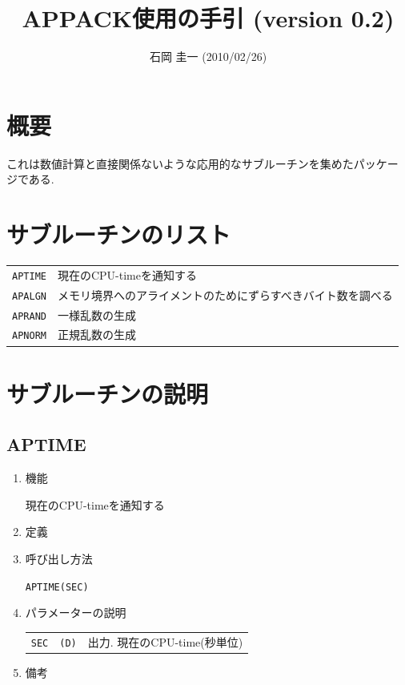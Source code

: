 \documentclass[a4j]{jarticle}
\title{APPACK使用の手引 (version 0.2)}
\author{石岡 圭一  (2010/02/26)}
\date{}
\begin{document}
\maketitle

\section{概要}

これは数値計算と直接関係ないような応用的なサブルーチンを集めたパッケー
ジである.


\section{サブルーチンのリスト}

\vspace{1em}
\begin{tabular}{ll}
{\tt APTIME} & 現在のCPU-timeを通知する\\
{\tt APALGN} & メモリ境界へのアライメントのためにずらすべきバイト数を調べる\\
{\tt APRAND} & 一様乱数の生成\\
{\tt APNORM} & 正規乱数の生成\\
\end{tabular}


\section{サブルーチンの説明}

\subsection{APTIME}

\begin{enumerate}

\item 機能 

現在のCPU-timeを通知する

\item 定義

\item 呼び出し方法 
    
{\tt APTIME(SEC)}
  
\item パラメーターの説明 
    
\begin{tabular}{lll}
{\tt SEC} & {\tt (D)} & 出力. 現在のCPU-time(秒単位)
\end{tabular}

\item 備考

\end{enumerate}
\end{document}
